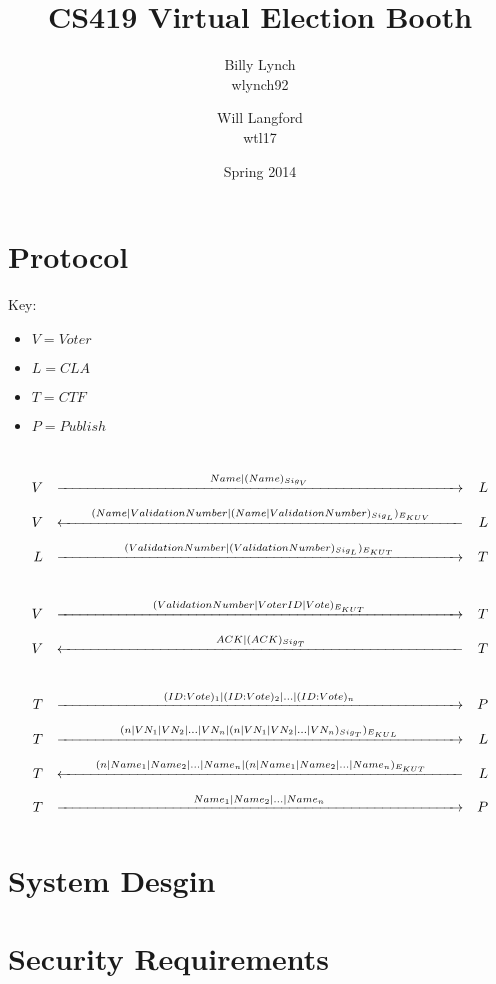 \documentclass[12pt]{article}
\title{CS419 Virtual Election Booth}
\author{Billy Lynch \\ wlynch92 \and Will Langford \\ wtl17}
\date{Spring 2014}
\begin{document}
\maketitle

\section{Protocol}
Key:
\begin{itemize}[label={}]
	\item $V = Voter$
	\item $L = CLA$
	\item $T = CTF$
	\item $P = Publish$
\end{itemize}
\hfill\\
\begin{align*}
	V && \xrightarrow[\hspace*{10cm}]{Name|(Name)_{Sig_{V}}} && L \\
	V && \xleftarrow[\hspace*{10cm}]{(Name|Validation Number|(Name|Validation Number)_{Sig_{L}})_{E_{KUV}}} && L \\
	L && \xrightarrow[\hspace*{10cm}]{(Validation Number|(Validation Number)_{Sig_{L}})_{E_{KUT}}} && T \\
	\hfill\\
	V && \xrightarrow[\hspace*{10cm}]{(Validation Number|Voter ID|Vote)_{E_{KUT}}} && T \\
	V && \xleftarrow[\hspace*{10cm}]{ACK|(ACK)_{Sig_{T}}} && T \\
	\hfill\\
	T && \xrightarrow[\hspace*{10cm}]{(ID:Vote)_1|(ID:Vote)_2|\dots|(ID:Vote)_n} && P \\
	T && \xrightarrow[\hspace*{10cm}]{(n|VN_1|VN_2|\dots|VN_n|(n|VN_1|VN_2|\dots|VN_n)_{Sig_T})_{E_{KUL}}} && L \\
	T && \xleftarrow[\hspace*{10cm}]{(n|Name_1|Name_2|\dots|Name_n|(n|Name_1|Name_2|\dots|Name_n)_{E_{KUT}}} && L \\
	T && \xrightarrow[\hspace*{10cm}]{Name_1|Name_2|\dots|Name_n} && P
\end{align*}

\section{System Desgin}

\section{Security Requirements}
\end{document}
